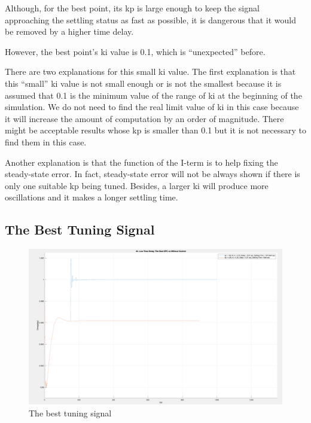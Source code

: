 Although, for the best point, its kp is large enough to keep the signal approaching the settling status as fast as possible, it is dangerous that it would be removed by a higher time delay. 

However, the best point's ki value is 0.1, which is “unexpected” before.  

There are two explanations for this small ki value. The first explanation is that this “small” ki value is not small enough or is not the smallest because it is assumed that 0.1 is the minimum value of the range of ki at the beginning of the simulation. We do not need to find the real limit value of ki in this case because it will increase the amount of computation by an order of magnitude. There might be acceptable results whose kp is smaller than 0.1 but it is not necessary to find them in this case.  

Another explanation is that the function of the I-term is to help fixing the steady-state error. In fact, steady-state error will not be always shown if there is only one suitable kp being tuned. Besides, a larger ki will produce more oscillations and it makes a longer settling time.  


\subsection{The Best Tuning Signal} %

\begin{figure}[htbp]
\centering
\includegraphics[width = .819\textwidth]{figure/4_4_2_best.png}
\caption{The best tuning signal}
\label{4_4_2_best}
\end{figure}